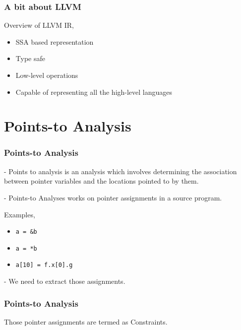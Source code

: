 \documentclass{beamer}
\begin{document}
\begin{frame}
\frametitle{A bit about LLVM}
Overview of LLVM IR,
\begin{itemize}
    \item<1-> SSA based representation
    \item<2-> Type safe
    \item<3-> Low-level operations
    \item<4-> Capable of representing all the high-level languages
\end{itemize}

\end{frame}

\section{Points-to Analysis}

\begin{frame}
\frametitle{Points-to Analysis}
- Points to analysis is an analysis which involves determining the association between
pointer variables and the locations pointed to by them.

\vspace{15pt}

\pause
- Points-to Analyses works on pointer assignments in a source program.

\pause
Examples,
\begin{itemize}
    \item<1-> \texttt{a = \&b}
    \item<2-> \texttt{a = *b}
    \item<3-> \texttt{a[10] = f.x[0].g}
\end{itemize}

\vspace{15pt}

\pause
\alert{- We need to extract those assignments.}

\end{frame}

\begin{frame}
\frametitle{Points-to Analysis}
Those pointer assignments are termed as Constraints.
\end{frame}
\end{document}
